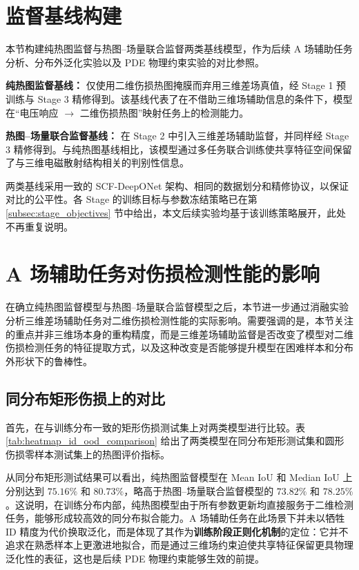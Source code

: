 \section{监督基线构建}
\label{sec:supervised_baselines}

本节构建纯热图监督与热图--场量联合监督两类基线模型，作为后续 A 场辅助任务分析、分布外泛化实验以及 PDE 物理约束实验的对比参照。

\textbf{纯热图监督基线：} 仅使用二维伤损热图掩膜而弃用三维差场真值，经 Stage 1 预训练与 Stage 3 精修得到。该基线代表了在不借助三维场辅助信息的条件下，模型在``电压响应 $\rightarrow$ 二维伤损热图''映射任务上的检测能力。

\textbf{热图--场量联合监督基线：} 在 Stage 2 中引入三维差场辅助监督，并同样经 Stage 3 精修得到。与纯热图基线相比，该模型通过多任务联合训练使共享特征空间保留了与三维电磁散射结构相关的判别性信息。

两类基线采用一致的 SCF-DeepONet 架构、相同的数据划分和精修协议，以保证对比的公平性。各 Stage 的训练目标与参数冻结策略已在第 \ref{subsec:stage_objectives} 节中给出，本文后续实验均基于该训练策略展开，此处不再重复说明。

\section{A 场辅助任务对伤损检测性能的影响}
\label{sec:impact_of_a_field}

在确立纯热图监督模型与热图--场量联合监督模型之后，本节进一步通过消融实验分析三维差场辅助任务对二维伤损检测性能的实际影响。需要强调的是，本节关注的重点并非三维场本身的重构精度，而是三维差场辅助监督是否改变了模型对二维伤损检测任务的特征提取方式，以及这种改变是否能够提升模型在困难样本和分布外形状下的鲁棒性。

\subsection{同分布矩形伤损上的对比}
\label{subsec:id_comparison}

首先，在与训练分布一致的矩形伤损测试集上对两类模型进行比较。表 \ref{tab:heatmap_id_ood_comparison} 给出了两类模型在同分布矩形测试集和圆形伤损零样本测试集上的热图评价指标。

从同分布矩形测试结果可以看出，纯热图监督模型在 Mean IoU 和 Median IoU 上分别达到 $75.16\%$ 和 $80.73\%$，略高于热图--场量联合监督模型的 $73.82\%$ 和 $78.25\%$。这说明，在训练分布内部，纯热图模型由于所有参数更新均直接服务于二维检测任务，能够形成较高效的同分布拟合能力。A 场辅助任务在此场景下并未以牺牲 ID 精度为代价换取泛化，而是体现了其作为\textbf{训练阶段正则化机制}的定位：它并不追求在熟悉样本上更激进地拟合，而是通过三维场约束迫使共享特征保留更具物理泛化性的表征，这也是后续 PDE 物理约束能够生效的前提。

